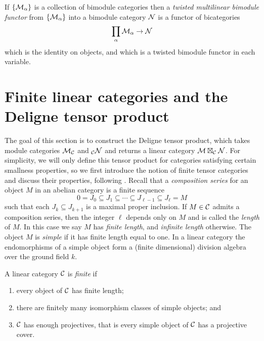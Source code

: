 \documentclass{amsart}
\begin{document}
If $\{ \mathcal M_\alpha \}$ is a collection of bimodule categories then a {\em twisted multilinear bimodule functor} from $\{ \mathcal M_\alpha \}$ into a bimodule category $\mathcal N$ is a functor of bicategories
\begin{equation*}
	\prod_{\alpha} \mathcal M_\alpha \to \mathcal N
\end{equation*}
which is the identity on objects, and which is a twisted bimodule functor in each variable. 

\section{Finite linear categories and the Deligne tensor product} \label{sec-tc-deligne}

The goal of this section is to construct the Deligne tensor product, which takes module categories $\mathcal M_\mathcal C$ and ${}_\mathcal C \mathcal N$ and returns a linear category $\mathcal M \boxtimes_\mathcal C \mathcal N$. For simplicity, we will only define this tensor product for categories satisfying certain smallness properties, so we first introduce the notion of finite tensor categories and discuss their properties, following \cite{MR2119143, EGNO}. Recall that a {\em composition series} for an object $M$ in an abelian category is a finite sequence
\begin{equation*}
	0 = J_0 \subseteq J_1 \subseteq \cdots \subseteq J_{\ell-1} \subseteq J_{\ell} = M
\end{equation*} 
such that each $J_k \subseteq J_{k+1}$ is a maximal proper inclusion. If $M \in \mathcal C$ admits a composition series, then the integer $\ell$ depends only on $M$ and is called the {\em length} of $M$. In this case we say $M$ has {\em finite length}, and {\em infinite length} otherwise. The object $M$ is {\em simple} if it has finite length equal to one. In a linear category the endomorphisms of a simple object form a (finite dimensional) division algebra over the ground field $k$. 

\begin{definition} %
	A linear category $\mathcal C$ is {\em finite} if 
	\begin{enumerate}
		\item every object of $\mathcal C$ has finite length; 
		\item there are finitely many isomorphism classes of simple objects; and  
		\item $\mathcal C$ has enough projectives, that is every simple object of $\mathcal C$ has a projective cover.
	\end{enumerate}
\end{definition}
\end{document}
